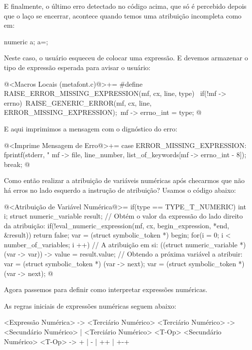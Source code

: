 E finalmente, o último erro detectado no código acima, que só é
percebido depois que o laço se encerrar, acontece quando temos uma
atribuição incompleta como em:

\alinhaverbatim
numeric a;
a=;
\alinhanormal

Neste caso, o usuário esqueceu de colocar uma expressão. E devemos
armazenar o tipo de expressão esperada para avisar o usuário:

\iniciocodigo
@<Macros Locais (metafont.c)@>+=
#define RAISE_ERROR_MISSING_EXPRESSION(mf, cx, line, type) {\
  if(!mf -> errno){\
    RAISE_GENERIC_ERROR(mf, cx, line, ERROR_MISSING_EXPRESSION);\
    mf -> errno_int = type;}}
@
\fimcodigo

E aqui imprimimos a mensagem com o dignóstico do erro:

\iniciocodigo
@<Imprime Mensagem de Erro@>+=
case ERROR_MISSING_EXPRESSION:
  fprintf(stderr, "%
          mf -> file, line_number, list_of_keywords[mf -> errno_int - 8]);
  break;
@
\fimcodigo


Como então realizar a atribuição de variáveis numéricas após checarmos
que não há erros no lado esquerdo a instrução de atribuição? Usamos o
código abaixo:

\iniciocodigo
@<Atribuição de Variável Numérica@>=
if(type == TYPE_T_NUMERIC){
  int i;
  struct numeric_variable result;
  // Obtém o valor da expressão do lado direito da atribuição:
  if(!eval_numeric_expression(mf, cx, begin_expression, *end, &result))
    return false;
  var = (struct symbolic_token *) begin;
  for(i = 0; i < number_of_variables; i ++){
    // A atribuição em si:
    ((struct numeric_variable *) (var -> var)) -> value = result.value;
    // Obtendo a próxima variável a atribuir:
    var = (struct symbolic_token *) (var -> next);
    var = (struct symbolic_token *) (var -> next);
  }
}
@
\fimcodigo

Agora passemos para definir como interpretar expressões numéricas.


As regras iniciais de expressões numéricas seguem abaixo:

\alinhaverbatim
<Expressão Numérica> -> <Terciário Numérico>
<Terciário Numérico> -> <Secundário Numérico> |
                        <Terciário Numérico> <T-Op> <Secundário Numérico>
<T-Op> -> + | - | ++ | +-+
\alinhanormal

